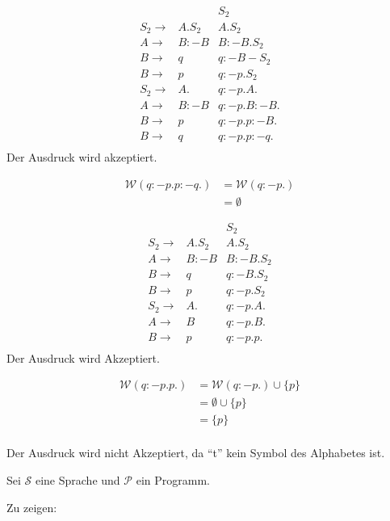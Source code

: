 \documentclass[a4paper,twoside]{HomeworkAssignment}
\begin{document}
\begin{align*}
         &&S_2\\
S_2 \rightarrow & A.S_2 & A.S_2\\ 
A   \rightarrow & B:-B & B:-B.S_2\\
B   \rightarrow & q & q:-B-S_2\\
B   \rightarrow & p & q:-p.S_2\\
S_2 \rightarrow & A. & q:-p.A.\\
A   \rightarrow & B:-B & q:-p.B:-B.\\
B   \rightarrow & p & q:-p.p:-B.\\
B   \rightarrow & q & q:-p.p:-q.\\
\end{align*}
Der Ausdruck wird akzeptiert.

\begin{align*}
\mathcal{W}(q:-p.p:-q.) & = \mathcal{W}(q:-p.)\\
& = \emptyset 
\end{align*}

\newsubsubproblem

\begin{align*}
&&S_2\\
S_2 \rightarrow & A.S_2 & A.S_2\\
A   \rightarrow & B:-B & B:-B.S_2\\
B   \rightarrow & q & q:-B.S_2\\
B   \rightarrow & p & q:-p.S_2\\
S_2 \rightarrow & A. & q:-p.A.\\
A   \rightarrow & B & q:-p.B.\\
B   \rightarrow & p & q:-p.p.\\
\end{align*}
Der Ausdruck wird Akzeptiert.

\begin{align*}
\mathcal{W}(q:-p.p.) & = \mathcal{W}(q:-p.) \cup \{ p \}\\
& = \emptyset \cup \{ p \}\\
& = \{ p \}\\
\end{align*}

\newsubsubproblem

Der Ausdruck wird nicht Akzeptiert, da \enquote{t} kein Symbol des Alphabetes ist.
\newsubproblem

Sei $\mathcal{S}$ eine Sprache und $\mathcal{P}$ ein Programm.

Zu zeigen:\\
\end{document}
